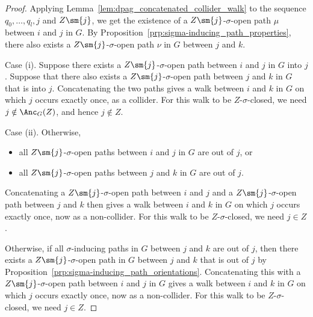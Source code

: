 \begin{proof}
  Applying Lemma~\ref{lem:dpag_concatenated_collider_walk} to the sequence $q_0,\dots,q_l,j$ and $Z\sm\{j\}$, we get the existence of a $Z\sm\{j\}$-$\sigma$-open path $\mu$ between $i$ and $j$ in $G$.
  By Proposition~\ref{prp:sigma-inducing_path_properties}, there also exists a $Z \sm \{j\}$-$\sigma$-open path $\nu$ in $G$ between $j$ and $k$.

  Case (i).
  Suppose there exists a $Z\sm\{j\}$-$\sigma$-open path between $i$ and $j$ in $G$ into $j$.
  Suppose that there also exists a $Z\sm\{j\}$-$\sigma$-open path between $j$ and $k$ in $G$ that is into $j$.
  Concatenating the two paths gives a walk between $i$ and $k$ in $G$ on which $j$ occurs exactly once, as a collider.
  For this walk to be $Z$-$\sigma$-closed, we need $j \notin \Anc_G(Z)$, and hence $j \notin Z$.
  
  Case (ii). Otherwise, 
  \begin{itemize}
    \item all $Z\sm\{j\}$-$\sigma$-open paths between $i$ and $j$ in $G$ are out of $j$, or
    \item all $Z\sm\{j\}$-$\sigma$-open paths between $j$ and $k$ in $G$ are out of $j$.
  \end{itemize}
  Concatenating a $Z\sm\{j\}$-$\sigma$-open path between $i$ and $j$ and 
  a $Z\sm\{j\}$-$\sigma$-open path between $j$ and $k$ then gives  
  a walk between $i$ and $k$ in $G$ on which $j$ occurs exactly once, now as a non-collider.
  For this walk to be $Z$-$\sigma$-closed, we need $j \in Z$.

  Otherwise, if all $\sigma$-inducing paths in $G$ between $j$ and $k$ are out of $j$, then there exists a $Z \sm \{j\}$-$\sigma$-open path in $G$ between $j$ and $k$ that is out of $j$ by Proposition~\ref{prp:sigma-inducing_path_orientations}.
  Concatenating this with a $Z\sm\{j\}$-$\sigma$-open path between $i$ and $j$ in $G$ gives a walk between $i$ and $k$ in $G$ on which $j$ occurs exactly once, now as a non-collider.
  For this walk to be $Z$-$\sigma$-closed, we need $j \in Z$.
  

\end{proof}
